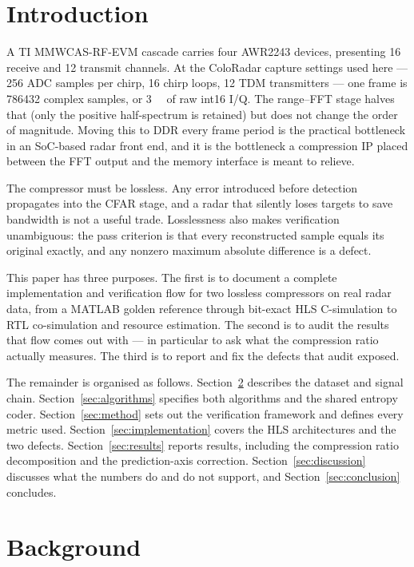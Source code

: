 \documentclass[10pt,twocolumn]{article}
\begin{document}
\section{Introduction}
\label{sec:intro}

A TI MMWCAS-RF-EVM cascade carries four AWR2243 devices, presenting 16 receive
and 12 transmit channels. At the ColoRadar capture settings used here --- 256
ADC samples per chirp, 16 chirp loops, 12 TDM transmitters --- one frame is
\num{786432} complex samples, or \SI{3}{\mebi\byte} of raw int16 I/Q. The
range--FFT stage halves that (only the positive half-spectrum is retained) but
does not change the order of magnitude. Moving this to DDR every frame period
is the practical bottleneck in an SoC-based radar front end, and it is the
bottleneck a compression IP placed between the FFT output and the memory
interface is meant to relieve.

The compressor must be lossless. Any error introduced before detection
propagates into the CFAR stage, and a radar that silently loses targets to save
bandwidth is not a useful trade. Losslessness also makes verification
unambiguous: the pass criterion is that every reconstructed sample equals its
original exactly, and any nonzero maximum absolute difference is a defect.

This paper has three purposes. The first is to document a complete
implementation and verification flow for two lossless compressors on real
radar data, from a MATLAB golden reference through bit-exact HLS C-simulation
to RTL co-simulation and resource estimation. The second is to audit the
results that flow comes out with --- in particular to ask what the compression
ratio actually measures. The third is to report and fix the defects that audit
exposed.

The remainder is organised as follows. Section~\ref{sec:background} describes
the dataset and signal chain. Section~\ref{sec:algorithms} specifies both
algorithms and the shared entropy coder. Section~\ref{sec:method} sets out the
verification framework and defines every metric used.
Section~\ref{sec:implementation} covers the HLS architectures and the two
defects. Section~\ref{sec:results} reports results, including the compression
ratio decomposition and the prediction-axis correction.
Section~\ref{sec:discussion} discusses what the numbers do and do not support,
and Section~\ref{sec:conclusion} concludes.

\section{Background}
\label{sec:background}
\end{document}
